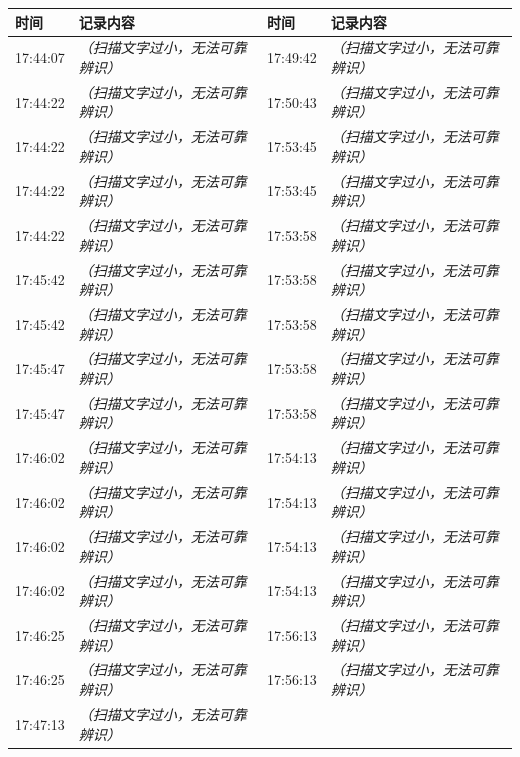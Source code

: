 \documentclass[UTF8,10pt,a4paper,fontset=fandol]{ctexart}
\begin{document}
\begin{center}
\scriptsize
\begin{tabularx}{\textwidth}{@{}lX@{\qquad}lX@{}}
\textbf{时间} & \textbf{记录内容} & \textbf{时间} & \textbf{记录内容} \\
\hline
17:44:07 & \textit{（扫描文字过小，无法可靠辨识）} &
17:49:42 & \textit{（扫描文字过小，无法可靠辨识）} \\[1pt]
17:44:22 & \textit{（扫描文字过小，无法可靠辨识）} &
17:50:43 & \textit{（扫描文字过小，无法可靠辨识）} \\[1pt]
17:44:22 & \textit{（扫描文字过小，无法可靠辨识）} &
17:53:45 & \textit{（扫描文字过小，无法可靠辨识）} \\[1pt]
17:44:22 & \textit{（扫描文字过小，无法可靠辨识）} &
17:53:45 & \textit{（扫描文字过小，无法可靠辨识）} \\[1pt]
17:44:22 & \textit{（扫描文字过小，无法可靠辨识）} &
17:53:58 & \textit{（扫描文字过小，无法可靠辨识）} \\[1pt]
17:45:42 & \textit{（扫描文字过小，无法可靠辨识）} &
17:53:58 & \textit{（扫描文字过小，无法可靠辨识）} \\[1pt]
17:45:42 & \textit{（扫描文字过小，无法可靠辨识）} &
17:53:58 & \textit{（扫描文字过小，无法可靠辨识）} \\[1pt]
17:45:47 & \textit{（扫描文字过小，无法可靠辨识）} &
17:53:58 & \textit{（扫描文字过小，无法可靠辨识）} \\[1pt]
17:45:47 & \textit{（扫描文字过小，无法可靠辨识）} &
17:53:58 & \textit{（扫描文字过小，无法可靠辨识）} \\[1pt]
17:46:02 & \textit{（扫描文字过小，无法可靠辨识）} &
17:54:13 & \textit{（扫描文字过小，无法可靠辨识）} \\[1pt]
17:46:02 & \textit{（扫描文字过小，无法可靠辨识）} &
17:54:13 & \textit{（扫描文字过小，无法可靠辨识）} \\[1pt]
17:46:02 & \textit{（扫描文字过小，无法可靠辨识）} &
17:54:13 & \textit{（扫描文字过小，无法可靠辨识）} \\[1pt]
17:46:02 & \textit{（扫描文字过小，无法可靠辨识）} &
17:54:13 & \textit{（扫描文字过小，无法可靠辨识）} \\[1pt]
17:46:25 & \textit{（扫描文字过小，无法可靠辨识）} &
17:56:13 & \textit{（扫描文字过小，无法可靠辨识）} \\[1pt]
17:46:25 & \textit{（扫描文字过小，无法可靠辨识）} &
17:56:13 & \textit{（扫描文字过小，无法可靠辨识）} \\[1pt]
17:47:13 & \textit{（扫描文字过小，无法可靠辨识）} &

\end{tabularx}
\end{center}
\end{document}
